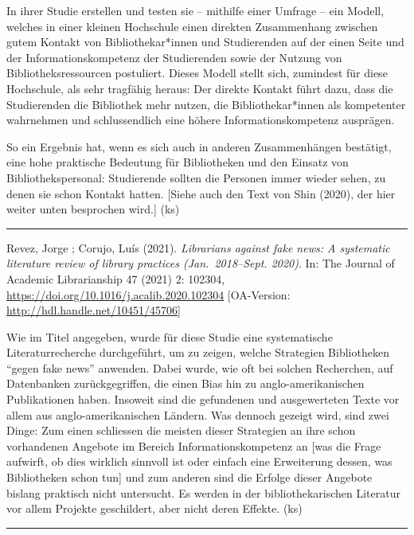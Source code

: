 \documentclass[a4paper,
fontsize=11pt,
oneside,
numbers=noperiodatend,
parskip=half-,
bibliography=totoc,
final
]{scrartcl}
\begin{document}
In ihrer Studie erstellen und testen sie -- mithilfe einer Umfrage --
ein Modell, welches in einer kleinen Hochschule einen direkten
Zusammenhang zwischen gutem Kontakt von Bibliothekar*innen und
Studierenden auf der einen Seite und der Informationskompetenz der
Studierenden sowie der Nutzung von Bibliotheksressourcen postuliert.
Dieses Modell stellt sich, zumindest für diese Hochschule, als sehr
tragfähig heraus: Der direkte Kontakt führt dazu, dass die Studierenden
die Bibliothek mehr nutzen, die Bibliothekar*innen als kompetenter
wahrnehmen und schlussendlich eine höhere Informationskompetenz
ausprägen.

So ein Ergebnis hat, wenn es sich auch in anderen Zusammenhängen
bestätigt, eine hohe praktische Bedeutung für Bibliotheken und den
Einsatz von Bibliothekspersonal: Studierende sollten die Personen immer
wieder sehen, zu denen sie schon Kontakt hatten. {[}Siehe auch den Text
von Shin (2020), der hier weiter unten besprochen wird.{]} (ks)

\begin{center}\rule{0.5\linewidth}{0.5pt}\end{center}

Revez, Jorge ; Corujo, Luís (2021). \emph{Librarians against fake news:
A systematic literature review of library practices (Jan.~2018--Sept.
2020)}. In: The Journal of Academic Librarianship 47 (2021) 2: 102304,
\url{https://doi.org/10.1016/j.acalib.2020.102304} {[}OA-Version:
\url{http://hdl.handle.net/10451/45706}{]}

Wie im Titel angegeben, wurde für diese Studie eine systematische
Literaturrecherche durchgeführt, um zu zeigen, welche Strategien
Bibliotheken \enquote{gegen fake news} anwenden. Dabei wurde, wie oft
bei solchen Recherchen, auf Datenbanken zurückgegriffen, die einen Bias
hin zu anglo-amerikanischen Publikationen haben. Insoweit sind die
gefundenen und ausgewerteten Texte vor allem aus anglo-amerikanischen
Ländern. Was dennoch gezeigt wird, sind zwei Dinge: Zum einen schliessen
die meisten dieser Strategien an ihre schon vorhandenen Angebote im
Bereich Informationskompetenz an {[}was die Frage aufwirft, ob dies
wirklich sinnvoll ist oder einfach eine Erweiterung dessen, was
Bibliotheken schon tun{]} und zum anderen sind die Erfolge dieser
Angebote bislang praktisch nicht untersucht. Es werden in der
bibliothekarischen Literatur vor allem Projekte geschildert, aber nicht
deren Effekte. (ks)

\begin{center}\rule{0.5\linewidth}{0.5pt}\end{center}
\end{document}

